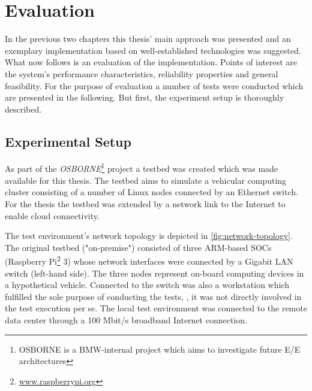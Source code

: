 \chapter{Evaluation}\label{chapter:evaluation}
In the previous two chapters this thesis' main approach was presented and an exemplary implementation based on well-established technologies was suggested. What now follows is an evaluation of the implementation. Points of interest are the system's performance characteristics, reliability properties and general feasibility. For the purpose of evaluation a number of tests were conducted which are presented in the following. But first, the experiment setup is thoroughly described.


\section{Experimental Setup}\label{sec:testsetup}

As part of the \emph{OSBORNE}\footnote{OSBORNE is a BMW-internal project which aims to investigate future E/E architectures} project a testbed was created which was made available for this thesis. The testbed aims to simulate a vehicular computing cluster consisting of a number of Linux nodes connected by an Ethernet switch. For the thesis the testbed was extended by a network link to the Internet to enable cloud connectivity. 

The test environment's network topology is depicted in \autoref{fig:network-topology}. The original testbed ("on-premise") consisted of three ARM-based SOCs (Raspberry Pi\footnote{\url{www.raspberrypi.org}} 3) whose network interfaces were connected by a Gigabit LAN switch (left-hand side). The three nodes represent on-board computing devices in a hypothetical vehicle. Connected to the switch was also a workstation which fulfilled the sole purpose of conducting the tests, \ie , it was not directly involved in the test execution per se. The local test environment was connected to the remote data center through a 100 Mbit/s broadband Internet connection.

